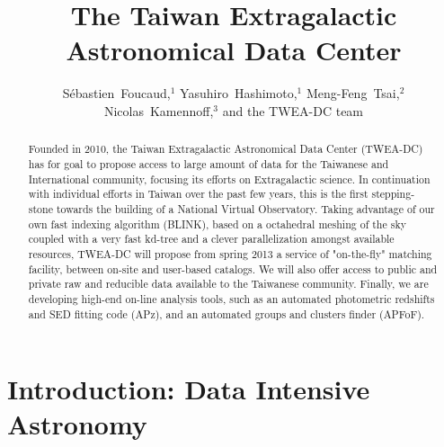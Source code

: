 
\resetcounters





\title{The Taiwan Extragalactic Astronomical Data Center}
\author{S\'ebastien~Foucaud,$^1$ Yasuhiro~Hashimoto,$^1$ Meng-Feng~Tsai,$^2$ Nicolas~Kamennoff,$^3$ and the TWEA-DC team
}


\begin{abstract}
Founded in 2010, the Taiwan Extragalactic Astronomical Data Center (TWEA-DC) has for goal to propose access to large amount of data for the Taiwanese and International community, focusing its efforts on Extragalactic science. In continuation with individual efforts in Taiwan over the past few years, this is the first stepping-stone towards the building of a National Virtual Observatory.  Taking advantage of our own fast indexing algorithm (BLINK), based on a octahedral meshing of the sky coupled with a very fast kd-tree and a clever parallelization amongst available resources, TWEA-DC will propose from spring 2013 a service of "on-the-fly" matching facility, between on-site and user-based catalogs.  We will also offer access to public and private raw and reducible data available to the Taiwanese community.  
Finally, we are developing high-end on-line analysis tools, such as an automated photometric redshifts and SED fitting code (APz), and an automated groups and clusters finder (APFoF).
\end{abstract}


\section{Introduction: Data Intensive Astronomy}

